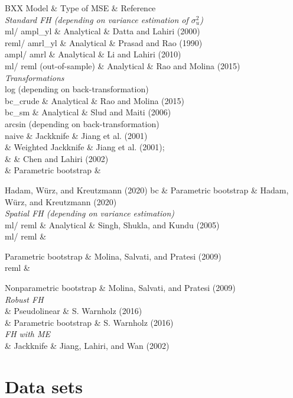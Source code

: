 BXX Model \& Type of MSE \& Reference\\
\emph{Standard FH (depending on variance estimation of \(\sigma^2_{u}\))}\\
ml/ ampl\_yl \& Analytical \& Datta and Lahiri (2000)\\
reml/ amrl\_yl \& Analytical \& Prasad and Rao (1990)\\
ampl/ amrl \& Analytical \& Li and Lahiri (2010)\\
ml/ reml (out-of-sample) \& Analytical \& Rao and Molina (2015)\\
\emph{Transformations}\\
log (depending on back-transformation)\\
bc\_crude \& Analytical \& Rao and Molina (2015)\\
bc\_sm \& Analytical \& Slud and Maiti (2006)\\
arcsin (depending on back-transformation)\\
naive \& Jackknife \& Jiang et al. (2001)\\
\& Weighted Jackknife \& Jiang et al. (2001);\\
\& \& Chen and Lahiri (2002)\\
\& Parametric bootstrap \&

Hadam, Würz, and Kreutzmann (2020) bc \& Parametric bootstrap \& Hadam, Würz, and Kreutzmann (2020)\\
\emph{Spatial FH (depending on variance estimation)}\\
ml/ reml \& Analytical \& Singh, Shukla, and Kundu (2005)\\
ml/ reml \&

Parametric bootstrap \& Molina, Salvati, and Pratesi (2009)\\
reml \&

Nonparametric bootstrap \& Molina, Salvati, and Pratesi (2009)\\
\emph{Robust FH}\\
\& Pseudolinear \& S. Warnholz (2016)\\
\& Parametric bootstrap \& S. Warnholz (2016)\\
\emph{FH with ME}\\
\& Jackknife \& Jiang, Lahiri, and Wan (2002)\\

\hypertarget{sec:data}{%
\section{Data sets}\label{sec:data}}

